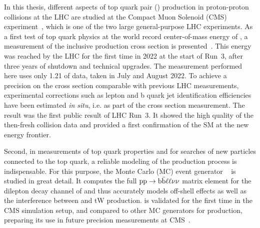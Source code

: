 In this thesis, different aspects of top quark pair (\ttbar) production in proton-proton collisions at the LHC are studied at the Compact Muon Solenoid (CMS) experiment~\cite{CMS:2008xjf}, which is one of the two large general-purpose LHC experiments. 
As a first test of top quark physics at the world record center-of-mass energy of \sqrtsRIII, a measurement of the inclusive \ttbar production cross section is presented~\cite{CMS:TOP-22-012}.
This energy was reached by the LHC for the first time in 2022 at the start of Run~3, after three years of shutdown and technical upgrades. The measurement performed here uses only \SI{1.21}{\fbinv} of data, taken in July and August 2022. To achieve a precision on the \ttbar cross section comparable with previous LHC measurements, experimental corrections such as lepton and b quark jet identification efficiencies have been estimated \textit{in situ}, i.e. as part of the cross section measurement. The result was the first public result of LHC Run~3. It showed the high quality of the then-fresh collision data and provided a first confirmation of the SM at the new energy frontier.


Second, in measurements of top quark properties and for searches of new particles connected to the top quark, a reliable modeling of the \ttbar production process is indispensable.
For this purpose, the Monte Carlo (MC) event generator \bbfourl~\cite{Jezo:2016ujg} is studied in great detail. It computes the full $\mathrm{p p} \rightarrow \mathrm{b \bar{b}} \ell \ell \nu \nu$ matrix element for the dilepton decay channel of \ttbar and thus accurately models off-shell effects as well as the interference between \ttbar and tW production.
\bbfourl is validated for the first time in the CMS simulation setup, and compared to other MC generators for \ttbar production, preparing its use in future precision measurements at CMS~\cite{CMS:NOTE-2023-015}.


